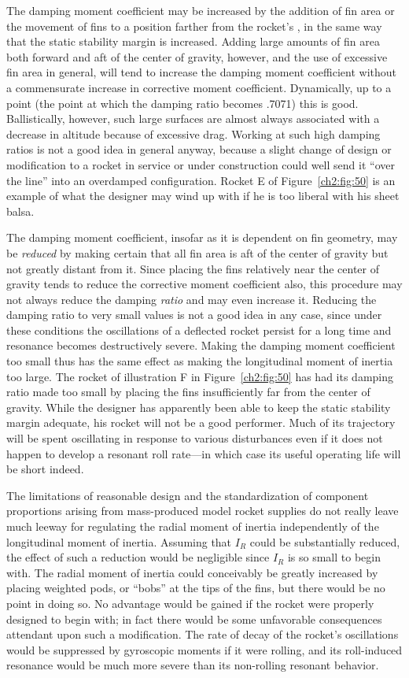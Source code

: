 The damping moment coefficient may be increased by the addition of fin area
or the movement of fins to a position farther from the rocket's \CG, in the
same way that the static stability margin is increased. Adding large amounts
of fin area both forward and aft of the center of gravity, however, and the
use of excessive fin area in general, will tend to increase the damping
moment coefficient without a commensurate increase in corrective moment
coefficient. Dynamically, up to a point (the point at which the damping ratio
becomes .7071) this is good. Ballistically, however, such large surfaces are
almost always associated with a decrease in altitude because of excessive
drag. Working at such high damping ratios is not a good idea in general
anyway, because a slight change of design or modification to a rocket in
service or under construction could well send it ``over the line'' into an
overdamped configuration. Rocket E of Figure~\ref{ch2:fig:50} is an example
of what the designer may wind up with if he is too liberal with his sheet
balsa.

The damping moment coefficient, insofar as it is dependent on fin geometry,
may be \emph{reduced} by making certain that all fin area is aft of the
center of gravity but not greatly distant from it. Since placing the fins
relatively near the center of gravity tends to reduce the corrective moment
coefficient also, this procedure may not always reduce the damping
\emph{ratio} and may even increase it. Reducing the damping ratio to very
small values is not a good idea in any case, since under these conditions the
oscillations of a deflected rocket persist for a long time and resonance
becomes destructively severe. Making the damping moment coefficient too small
thus has the same effect as making the longitudinal moment of inertia too
large. The rocket of illustration F in Figure~\ref{ch2:fig:50} has had its
damping ratio made too small by placing the fins insufficiently far from the
center of gravity. While the designer has apparently been able to keep the
static stability margin adequate, his rocket will not be a good performer.
Much of its trajectory will be spent oscillating in response to various
disturbances even if it does not happen to develop a resonant roll rate---in
which case its useful operating life will be short indeed.

The limitations of reasonable design and the standardization of component
proportions arising from mass-produced model rocket supplies do not really
leave much leeway for regulating the radial moment of inertia independently
of the longitudinal moment of inertia. Assuming that $I_R$ could be
substantially reduced, the effect of such a reduction would be negligible
since $I_R$ is so small to begin with. The radial moment of inertia could
conceivably be greatly increased by placing weighted pods, or ``bobs'' at the
tips of the fins, but there would be no point in doing so. No advantage would
be gained if the rocket were properly designed to begin with; in fact there
would be some unfavorable consequences attendant upon such a modification.
The rate of decay of the rocket's oscillations would be suppressed by
gyroscopic moments if it were rolling, and its roll-induced resonance would
be much more severe than its non-rolling resonant behavior.

